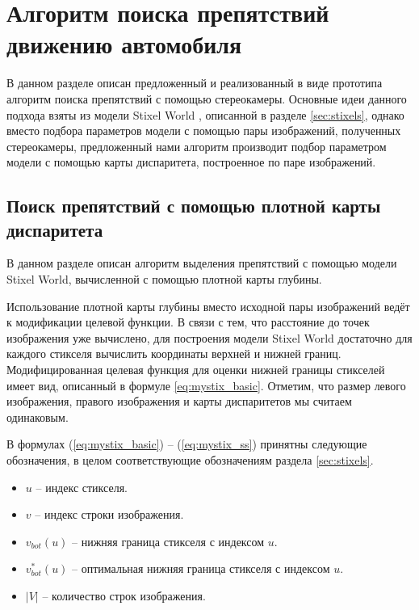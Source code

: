 \documentclass[aps,%
14pt,%
final,%
oneside,
onecolumn,%
musixtex, %
superscriptaddress,%
centertags]{extarticle} %
\begin{document}
\newpage
\section{Алгоритм поиска препятствий движению автомобиля}\label{sec:mystix_dense}

В данном разделе описан предложенный и реализованный в виде прототипа алгоритм поиска препятствий с помощью стереокамеры. Основные идеи данного подхода взяты из модели Stixel World \cite{pfeiffer2010efficient}, описанной в разделе \ref{sec:stixels}, однако вместо подбора параметров модели с помощью пары изображений, полученных стереокамеры, предложенный нами алгоритм производит подбор параметром модели с помощью карты диспаритета, построенное по паре изображений.

\subsection{Поиск препятствий с помощью плотной карты диспаритета}\label{sec:my_dense_stixels}

В данном разделе описан алгоритм выделения препятствий с помощью модели Stixel World, вычисленной с помощью плотной карты глубины.

Использование плотной карты глубины вместо исходной пары изображений ведёт к модификации целевой функции. В связи с тем, что расстояние до точек изображения уже вычислено, для построения модели Stixel World достаточно для каждого стикселя вычислить координаты верхней и нижней границ. Модифицированная целевая функция для оценки нижней границы стикселей имеет вид, описанный в формуле \ref{eq:mystix_basic}. Отметим, что размер левого изображения, правого изображения и карты диспаритетов мы считаем одинаковым.

В формулах (\ref{eq:mystix_basic}) -- (\ref{eq:mystix_ss}) принятны следующие обозначения, в целом соответствующие обозначениям раздела \ref{sec:stixels}.

\begin{itemize}

\item $u$ -- индекс стикселя.

\item $v$ -- индекс строки изображения.

\item $v_{bot}(u)$ -- нижняя граница стикселя с индексом $u$.

\item $v_{bot}^*(u)$ -- оптимальная нижняя граница стикселя с индексом $u$.

\item $|V|$ -- количество строк изображения.

\end{itemize}
\end{document}
